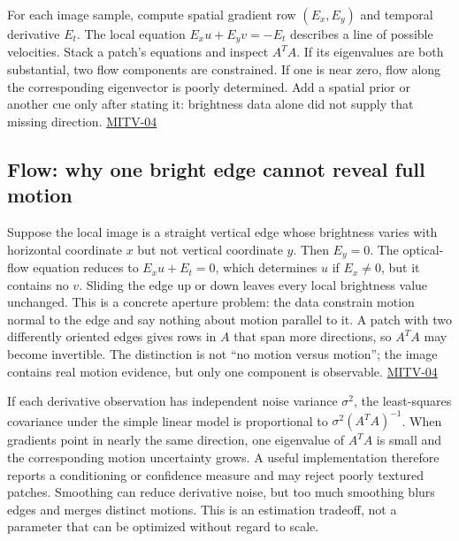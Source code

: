For each image sample, compute spatial gradient row \((E_x,E_y)\) and temporal derivative \(E_t\). The local equation \(E_xu+E_yv=-E_t\) describes a line of possible velocities. Stack a patch's equations and inspect \(A^TA\). If its eigenvalues are both substantial, two flow components are constrained. If one is near zero, flow along the corresponding eigenvector is poorly determined. Add a spatial prior or another cue only after stating it: brightness data alone did not supply that missing direction. \hyperref[04-visual-computing-ii-ch036-mitv-04---fixed-optical-flow-optical-mouse-constant-brightness-assumption-closed-form-solution]{MITV-04}

\subsection{Flow: why one bright edge cannot reveal full motion}\label{04-visual-computing-ii-ch030-flow-why-one-bright-edge-cannot-reveal-full-motion}

Suppose the local image is a straight vertical edge whose brightness varies with horizontal coordinate \(x\) but not vertical coordinate \(y\). Then \(E_y=0\). The optical-flow equation reduces to \(E_xu+E_t=0\), which determines \(u\) if \(E_x\ne0\), but it contains no \(v\). Sliding the edge up or down leaves every local brightness value unchanged. This is a concrete aperture problem: the data constrain motion normal to the edge and say nothing about motion parallel to it. A patch with two differently oriented edges gives rows in \(A\) that span more directions, so \(A^TA\) may become invertible. The distinction is not ``no motion versus motion''; the image contains real motion evidence, but only one component is observable. \hyperref[04-visual-computing-ii-ch036-mitv-04---fixed-optical-flow-optical-mouse-constant-brightness-assumption-closed-form-solution]{MITV-04}

If each derivative observation has independent noise variance \(\sigma^2\), the least-squares covariance under the simple linear model is proportional to \(\sigma^2(A^TA)^{-1}\). When gradients point in nearly the same direction, one eigenvalue of \(A^TA\) is small and the corresponding motion uncertainty grows. A useful implementation therefore reports a conditioning or confidence measure and may reject poorly textured patches. Smoothing can reduce derivative noise, but too much smoothing blurs edges and merges distinct motions. This is an estimation tradeoff, not a parameter that can be optimized without regard to scale.

